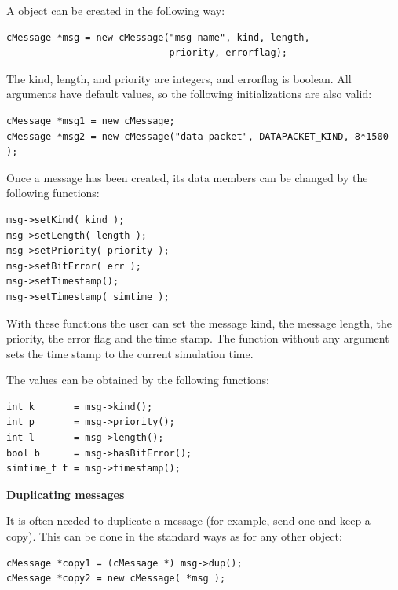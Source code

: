 A  object can be created in the following way:

\begin{Verbatim}
cMessage *msg = new cMessage("msg-name", kind, length,
                             priority, errorflag);
\end{Verbatim}


The kind, length, and priority are integers, and errorflag is boolean. 
All arguments have default values, so the following initializations 
are also valid:

\begin{Verbatim}
cMessage *msg1 = new cMessage;
cMessage *msg2 = new cMessage("data-packet", DATAPACKET_KIND, 8*1500 );
\end{Verbatim}


Once a message has been created, its data members can be changed by the following functions:

\begin{Verbatim}
msg->setKind( kind );
msg->setLength( length );
msg->setPriority( priority );
msg->setBitError( err );
msg->setTimestamp();
msg->setTimestamp( simtime );
\end{Verbatim}


With these functions the user can set the message
kind, the message length,
the priority, the error
flag and the time stamp. The  function without any argument
sets the time stamp to the current simulation time.


The values can be obtained by the following functions:

\begin{Verbatim}
int k       = msg->kind();
int p       = msg->priority();
int l       = msg->length();
bool b      = msg->hasBitError();
simtime_t t = msg->timestamp();
\end{Verbatim}


\textbf{Duplicating messages}


It is often needed to duplicate a message (for example, send 
one and keep a copy). This can be done in the standard ways as 
for any other {\opp} object:

\begin{Verbatim}
cMessage *copy1 = (cMessage *) msg->dup();
cMessage *copy2 = new cMessage( *msg );
\end{Verbatim}


